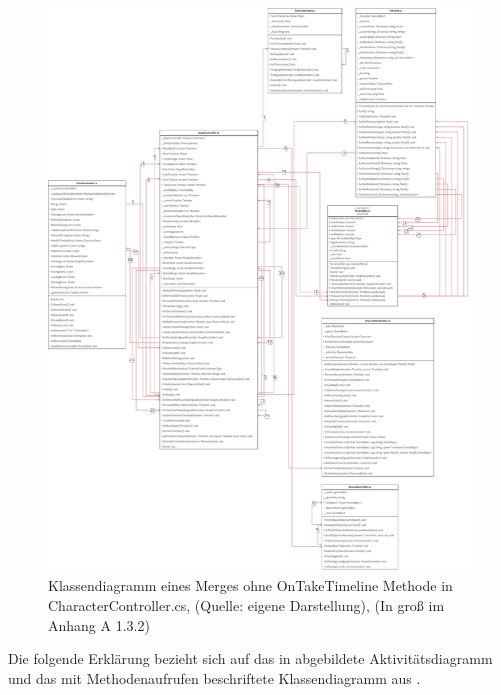 \begin{figure}[p]
\centering
\includegraphics[width=1\linewidth]{content/pictures/merge_classes.jpg}
\caption{Klassendiagramm eines Merges ohne OnTakeTimeline Methode in CharacterController.cs, (Quelle: eigene Darstellung), (In groß im Anhang A 1.3.2)}
\label{fig:merge-class}
\end{figure}

Die folgende Erklärung bezieht sich auf das in  abgebildete Aktivitätsdiagramm und das mit Methodenaufrufen beschriftete Klassendiagramm aus .

